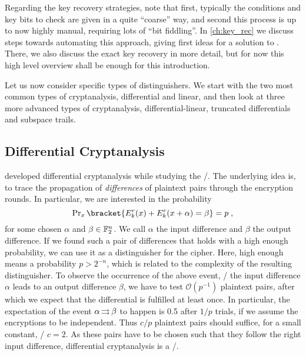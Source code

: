 Regarding the key recovery strategies, note that first, typically the conditions and key bits to check are given in a quite \enquote{coarse} way, and second this process is up to now highly manual, requiring lots of \enquote{bit fiddling}.
In \cref{ch:key_rec} we discuss steps towards automating this approach, giving first ideas for a solution to .
There, we also discuss the exact key recovery in more detail, but for now this high level overview shall be enough for this introduction.

Let us now consider specific types of distinguishers.
We start with the two most common types of cryptanalysis, differential and linear, and then look at three more advanced types of cryptanalysis, differential-linear, truncated differentials and subspace trails.

\subsection{Differential Cryptanalysis}\label{sec:prelim:dc}
\textcite{C:BihSha90} developed differential cryptanalysis while studying the \DES/.
The underlying idea is, to trace the propagation of \emph{differences} of plaintext pairs through the encryption rounds.
In particular, we are interested in the probability
\begin{equation*}
    \Prob_x\bracket{E_k^r(x) + E_k^r(x + \alpha) = \beta} = p\;,
\end{equation*}
for some chosen $\alpha$ and $\beta \in \mathbb{F}_2^n$.
We call $\alpha$ the input difference and $\beta$ the output difference.
If we found such a pair of differences that holds with a high enough probability, we can use it as a distinguisher for the cipher.
Here, high enough means a probability $p > 2^{-n}$, which is related to the complexity of the resulting distinguisher.
To observe the occurrence of the above event, \ie/ the input difference $\alpha$ leads to an output difference $\beta$, we have to test $\mathcal{O}(p^{-1})$ plaintext pairs, after which we expect that the differential is fulfilled at least once.
In particular, the expectation of the event $\alpha \operatorname*{\rightrightarrows}^{}_{} \beta$ to happen is 0.5 after $1/p$ trials, if we assume the encryptions to be independent.
Thus $c/p$ plaintext pairs should suffice, for a small constant, \eg/ $c = 2$.
As these pairs have to be chosen such that they follow the right input difference, differential cryptanalysis is a \CPAl/.

